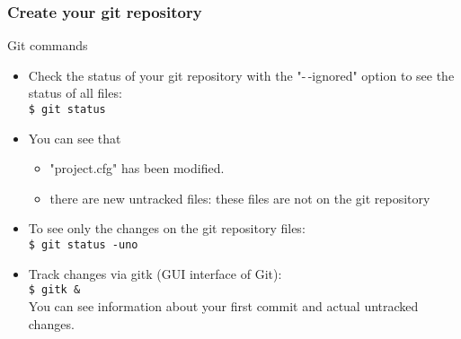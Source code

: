 \documentclass[10pt, hyperref={unicode=true,pdfusetitle, bookmarks=true,bookmarksnumbered=false,bookmarksopen=false, breaklinks=false,pdfborder={0 0 1},backref=true,colorlinks=true,linkcolor=darkblue,pageanchor, urlcolor=darkblue}]{beamer}
\begin{document}
\begin{frame}
\frametitle{Create your git repository}
\begin{alertblock}{Git commands}

\begin{itemize}
\item Check the status of your git repository with the "-\,-ignored" option to see the status of all files:\\
\texttt{\$ git status}\\

\item You can see that 
\begin{itemize}
\item "project.cfg" has been modified.
\item there are new untracked files: these files are not on the git repository
\end{itemize}

\item To see only the changes on the git repository files:\\
\texttt{\$ git status -uno}\\

\item Track changes via gitk (GUI interface of Git):\\
\texttt{\$ gitk \&} \\

You can see information about your first commit and actual untracked changes.
\end{itemize}

\end{alertblock}
\end{frame}
\end{document}
